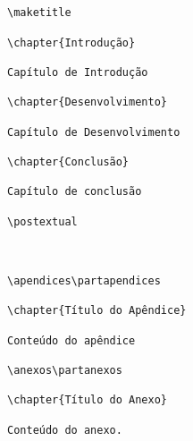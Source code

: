 \begin{Verbatim}[frame=single, fontsize=\scriptsize]
% Início do documento


\maketitle

\chapter{Introdução}

Capítulo de Introdução

\chapter{Desenvolvimento}

Capítulo de Desenvolvimento

\chapter{Conclusão}

Capítulo de conclusão

\postextual



\apendices\partapendices

\chapter{Título do Apêndice}

Conteúdo do apêndice

\anexos\partanexos

\chapter{Título do Anexo}

Conteúdo do anexo.


\end{Verbatim}
